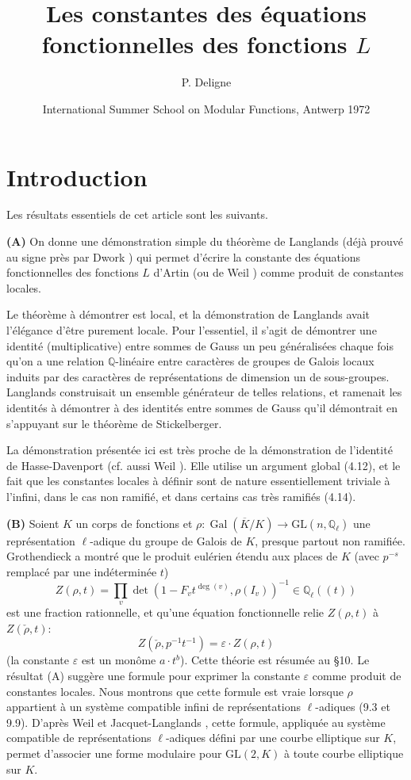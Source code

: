 \documentclass[11pt,a4paper]{amsart}
\title{Les constantes des \'equations fonctionnelles des fonctions $L$}
\author{P. Deligne}
\date{International Summer School on Modular Functions, Antwerp 1972}
\theoremstyle{plain}
\theoremstyle{definition}
\DeclareMathOperator{\Gal}{Gal}
\newcommand{\dbQ}{\mathbb{Q}}
\newcommand{\GL}{\mathrm{GL}}
\newcommand{\ov}[1]{\overline{#1}}
\newcommand{\eps}{\varepsilon}
\begin{document}
\maketitle
\tableofcontents

\section*{Introduction}

Les r\'esultats essentiels de cet article sont les suivants.

\medskip
\noindent
\textbf{(A)} On donne une d\'emonstration simple du th\'eor\`eme de Langlands \cite{9} (d\'ej\`a prouv\'e au signe pr\`es par Dwork \cite{6}) qui permet d'\'ecrire la constante des \'equations fonctionnelles des fonctions $L$ d'Artin (ou de Weil \cite{19}) comme produit de constantes locales.

Le th\'eor\`eme \`a d\'emontrer est local, et la d\'emonstration de Langlands avait l'\'el\'egance d'\^etre purement locale. Pour l'essentiel, il s'agit de d\'emontrer une identit\'e (multiplicative) entre sommes de Gauss un peu g\'en\'eralis\'ees chaque fois qu'on a une relation $\dbQ$-lin\'eaire entre caract\`eres de groupes de Galois locaux induits par des caract\`eres de repr\'esentations de dimension un de sous-groupes. Langlands construisait un ensemble g\'en\'erateur de telles relations, et ramenait les identit\'es \`a d\'emontrer \`a des identit\'es entre sommes de Gauss qu'il d\'emontrait en s'appuyant sur le th\'eor\`eme de Stickelberger.

La d\'emonstration pr\'esent\'ee ici est tr\`es proche de la d\'emonstration \cite{5} de l'identit\'e de Hasse-Davenport (cf. aussi Weil \cite{18}). Elle utilise un argument global (4.12), et le fait que les constantes locales \`a d\'efinir sont de nature essentiellement triviale \`a l'infini, dans le cas non ramifi\'e, et dans certains cas tr\`es ramifi\'es (4.14).

\medskip
\noindent
\textbf{(B)} Soient $K$ un corps de fonctions et $\rho: \Gal(\ov{K}/K) \to \GL(n,\dbQ_{\ell})$ une repr\'esentation $\ell$-adique du groupe de Galois de $K$, presque partout non ramifi\'ee. Grothendieck a montr\'e que le produit eul\'erien \'etendu aux places de $K$ (avec $p^{-s}$ remplac\'e par une ind\'etermin\'ee $t$)
\[
Z(\rho,t) = \prod_{v} \det(1 - F_{v} t^{\deg(v)}, \rho(I_{v}))^{-1} \in \dbQ_{\ell}((t))
\]
est une fraction rationnelle, et qu'une \'equation fonctionnelle relie $Z(\rho,t)$ \`a $Z(\check{\rho},t)$:
\[
Z(\check{\rho}, p^{-1}t^{-1}) = \eps \cdot Z(\rho,t)
\]
(la constante $\eps$ est un mon\^ome $a \cdot t^{b}$). Cette th\'eorie est r\'esum\'ee au \S10. Le r\'esultat (A) sugg\`ere une formule pour exprimer la constante $\eps$ comme produit de constantes locales. Nous montrons que cette formule est vraie lorsque $\rho$ appartient \`a un syst\`eme compatible infini de repr\'esentations $\ell$-adiques (9.3 et 9.9). D'apr\`es Weil \cite{16} et Jacquet-Langlands \cite{8}, cette formule, appliqu\'ee au syst\`eme compatible de repr\'esentations $\ell$-adiques d\'efini par une courbe elliptique sur $K$, permet d'associer une forme modulaire pour $\GL(2,K)$ \`a toute courbe elliptique sur $K$.
\end{document}
